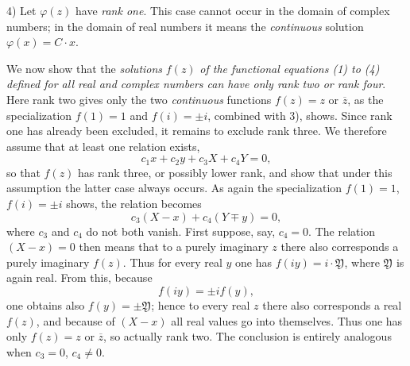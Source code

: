 \documentclass[11pt]{article}
\providecommand{\Yreal}{\mathfrak Y}
\begin{document}
4) Let \(\varphi(z)\) have \emph{rank one}. This case cannot occur in the domain of complex numbers; in the domain of real numbers it means the \emph{continuous} solution \(\varphi(x)=C\cdot x\).

We now show that the \emph{solutions} \(f(z)\) \emph{of the functional equations (1) to (4) defined for all real and complex numbers can have only rank two or rank four}. Here rank two gives only the two \emph{continuous} functions \(f(z)=z\) or \(\overline z\), as the specialization \(f(1)=1\) and \(f(i)=\pm i\), combined with 3), shows. Since rank one has already been excluded, it remains to exclude rank three. We therefore assume that at least one relation exists,
\[
c_1x+c_2y+c_3X+c_4Y=0,
\]
so that \(f(z)\) has rank three, or possibly lower rank, and show that under this assumption the latter case always occurs. As again the specialization \(f(1)=1\), \(f(i)=\pm i\) shows, the relation becomes
\[
c_3(X-x)+c_4(Y\mp y)=0,
\]
where \(c_3\) and \(c_4\) do not both vanish. First suppose, say, \(c_4=0\). The relation \((X-x)=0\) then means that to a purely imaginary \(z\) there also corresponds a purely imaginary \(f(z)\). Thus for every real \(y\) one has \(f(iy)=i\cdot\Yreal\), where \(\Yreal\) is again real. From this, because
\[
f(iy)=\pm i f(y),
\]
one obtains also \(f(y)=\pm\Yreal\); hence to every real \(z\) there also corresponds a real \(f(z)\), and because of \((X-x)\) all real values go into themselves. Thus one has only \(f(z)=z\) or \(\overline z\), so actually rank two. The conclusion is entirely analogous when \(c_3=0\), \(c_4\ne0\).
\end{document}
